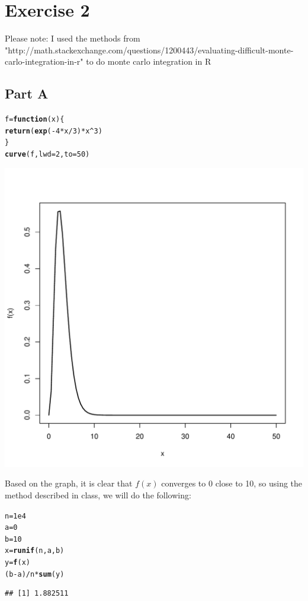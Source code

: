 \documentclass{article}\usepackage[]{graphicx}\usepackage[]{color}
\makeatletter
\newcommand{\hlnum}[1]{\textcolor[rgb]{0.686,0.059,0.569}{#1}}%
\newcommand{\hlopt}[1]{\textcolor[rgb]{0,0,0}{#1}}%
\newcommand{\hlstd}[1]{\textcolor[rgb]{0.345,0.345,0.345}{#1}}%
\newcommand{\hlkwa}[1]{\textcolor[rgb]{0.161,0.373,0.58}{\textbf{#1}}}%
\newcommand{\hlkwb}[1]{\textcolor[rgb]{0.69,0.353,0.396}{#1}}%
\newcommand{\hlkwc}[1]{\textcolor[rgb]{0.333,0.667,0.333}{#1}}%
\newcommand{\hlkwd}[1]{\textcolor[rgb]{0.737,0.353,0.396}{\textbf{#1}}}%
\newenvironment{kframe}{%
 \def\at@end@of@kframe{}%
 \ifinner\ifhmode%
  \def\at@end@of@kframe{\end{minipage}}%
  \begin{minipage}{\columnwidth}%
 \fi\fi%
 \def\FrameCommand##1{\hskip\@totalleftmargin \hskip-\fboxsep
 \colorbox{shadecolor}{##1}\hskip-\fboxsep
     \hskip-\linewidth \hskip-\@totalleftmargin \hskip\columnwidth}%
 \MakeFramed {\advance\hsize-\width
   \@totalleftmargin\z@ \linewidth\hsize
   \@setminipage}}%
 {\par\unskip\endMakeFramed%
 \at@end@of@kframe}
\newenvironment{knitrout}{}{} %
\makeatother
\begin{document}
\section*{Exercise 2}
Please note: I used the methods from "http://math.stackexchange.com/questions/1200443/evaluating-difficult-monte-carlo-integration-in-r" to do monte carlo integration in R
\subsection*{Part A}
\begin{knitrout}
\color{fgcolor}\begin{kframe}
\begin{alltt}
\hlstd{f} \hlkwb{=} \hlkwa{function}\hlstd{(}\hlkwc{x}\hlstd{)\{}
  \hlkwd{return}\hlstd{(}\hlkwd{exp}\hlstd{(}\hlopt{-}\hlnum{4}\hlopt{*}\hlstd{x}\hlopt{/}\hlnum{3}\hlstd{)}\hlopt{*}\hlstd{x}\hlopt{^}\hlnum{3}\hlstd{)}
\hlstd{\}}
\hlkwd{curve}\hlstd{(f,} \hlkwc{lwd}\hlstd{=}\hlnum{2}\hlstd{,}\hlkwc{to} \hlstd{=} \hlnum{50}\hlstd{)}
\end{alltt}
\end{kframe}
\includegraphics[width=0.60\linewidth]{figure/unnamed-chunk-3-1} 

\end{knitrout}
Based on the graph, it is clear that $f(x)$ converges to 0 close to 10, so using the method described in class, we will do the following:
\begin{knitrout}
\color{fgcolor}\begin{kframe}
\begin{alltt}
\hlstd{n} \hlkwb{=} \hlnum{1e4}
\hlstd{a} \hlkwb{=} \hlnum{0}
\hlstd{b} \hlkwb{=} \hlnum{10}
\hlstd{x} \hlkwb{=} \hlkwd{runif}\hlstd{(n, a, b)}
\hlstd{y} \hlkwb{=} \hlkwd{f}\hlstd{(x)}
\hlstd{(b}\hlopt{-}\hlstd{a)}\hlopt{/}\hlstd{n}\hlopt{*}\hlkwd{sum}\hlstd{(y)}
\end{alltt}
\begin{verbatim}
## [1] 1.882511
\end{verbatim}
\end{kframe}
\end{knitrout}
\end{document}
